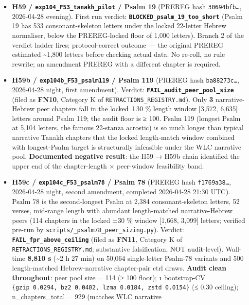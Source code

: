 \documentclass[
]{article}
\begin{document}
\begin{itemize}
\item
  \textbf{H59 / \texttt{exp104\_F53\_tanakh\_pilot} / Psalm 19} (PREREG
  hash \texttt{30694bfb…}, 2026-04-28 evening). First run verdict:
  \textbf{\texttt{BLOCKED\_psalm\_19\_too\_short}} (Psalm 19 has 533
  consonant-skeleton letters under the locked 22-letter Hebrew
  normaliser, below the PREREG-locked floor of 1,000 letters). Branch 2
  of the verdict ladder fires; protocol-correct outcome --- the original
  PREREG estimated \textasciitilde1,800 letters before checking actual
  data. No re-roll, no rule rewrite; an amendment PREREG with a
  different chapter is required.
\item
  \textbf{H59b / \texttt{exp104b\_F53\_psalm119} / Psalm 119} (PREREG
  hash \texttt{ba88273c…}, 2026-04-28 night, first amendment). Verdict:
  \textbf{\texttt{FAIL\_audit\_peer\_pool\_size}} (filed as
  \textbf{FN10}, Category K of \texttt{RETRACTIONS\_REGISTRY.md}). Only
  \textbf{3} narrative-Hebrew peer chapters fall in the locked ±30 \%
  length window {[}3,572, 6,635{]} letters around Psalm 119; the audit
  floor is ≥ 100. Psalm 119 (longest Psalm at 5,104 letters, the famous
  22-stanza acrostic) is so much longer than typical narrative Tanakh
  chapters that the locked length-match window combined with
  longest-Psalm target is structurally infeasible under the WLC
  narrative pool. \textbf{Documented negative result}: the H59 → H59b
  chain identified the upper end of the chapter-length × peer-window
  feasibility band.
\item
  \textbf{H59c / \texttt{exp104c\_F53\_psalm78} / Psalm 78} (PREREG hash
  \texttt{f1769a38…}, 2026-04-28 night, second amendment, completed
  2026-04-28 21:30 UTC). Psalm 78 is the second-longest Psalm at 2,384
  consonant-skeleton letters, 52 verses, mid-range length with abundant
  length-matched narrative-Hebrew peers (114 chapters in the locked ±30
  \% window {[}1,668, 3,099{]} letters; verified pre-run by
  \texttt{scripts/\_psalm78\_peer\_sizing.py}). Verdict:
  \textbf{\texttt{FAIL\_fpr\_above\_ceiling}} (filed as \textbf{FN11},
  Category K of \texttt{RETRACTIONS\_REGISTRY.md}; substantive
  falsification, NOT audit-level). Wall-time \textbf{8,810 s}
  (\textasciitilde2 h 27 min) on 50,064 single-letter Psalm-78 variants
  and 500 length-matched Hebrew-narrative chapter-pair ctrl draws.
  \textbf{Audit clean throughout}: peer pool size = 114 (≥ 100 floor); τ
  bootstrap-CV
  \texttt{\{gzip\ 0.0294,\ bz2\ 0.0402,\ lzma\ 0.0184,\ zstd\ 0.0154\}}
  (≤ 0.30 ceiling); n\_chapters\_total = 929 (matches WLC narrative

\end{itemize}
\end{document}
